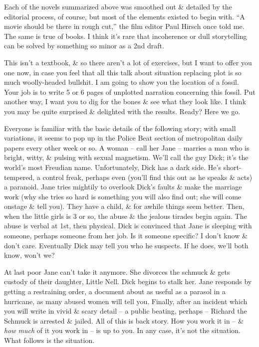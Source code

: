 \documentclass{article}
\numberwithin{equation}{section}
\begin{document}
Each of the novels summarized above was smoothed out \& detailed by the editorial process, of course, but most of the elements existed to begin with. ``A movie should be there in rough cut,'' the film editor Paul Hirsch once told me. The same is true of books. I think it's rare that incoherence or dull storytelling can be solved by something so minor as a 2nd draft.

This isn't a textbook, \& so there aren't a lot of exercises, but I want to offer you one now, in case you feel that all this talk about situation replacing plot is so much woolly-headed bullshit. I am going to show you the location of a fossil. Your job is to write 5 or 6 pages of unplotted narration concerning this fossil. Put another way, I want you to dig for the bones \& see what they look like. I think you may be quite surprised \& delighted with the results. Ready? Here we go.

Everyone is familiar with the basic details of the following story; with small variations, it seems to pop up in the Police Beat section of metropolitan daily papers every other week or so. A woman -- call her Jane -- marries a man who is bright, witty, \& pulsing with sexual magnetism. We'll call the guy Dick; it's the world's most Freudian name. Unfortunately, Dick has a dark side. He's short-tempered, a control freak, perhaps even (you'll find this out as he speaks \& acts) a paranoid. Jane tries mightily to overlook Dick's faults \& make the marriage work (why she tries so hard is something you will also find out; she will come onstage \& tell you). They have a child, \& for awhile things seem better. Then, when the little girls is 3 or so, the abuse \& the jealous tirades begin again. The abuse is verbal at 1st, then physical. Dick is convinced that Jane is sleeping with someone, perhaps someone from her job. Is it someone specific? I don't know \& don't care. Eventually Dick may tell you who he suspects. If he does, we'll both know, won't we?

At last poor Jane can't take it anymore. She divorces the schmuck \& gets custody of their daughter, Little Nell. Dick begins to stalk her. Jane responds by getting a restraining order, a document about as useful as a parasol in a hurricane, as many abused women will tell you. Finally, after an incident which you will write in vivid \& scary detail -- a public beating, perhaps -- Richard the Schmuck is arrested \& jailed. All of this is back story. How you work it in -- \& \textit{how much} of it you work in -- is up to you. In any case, it's not the situation. What follows is the situation.
\end{document}
